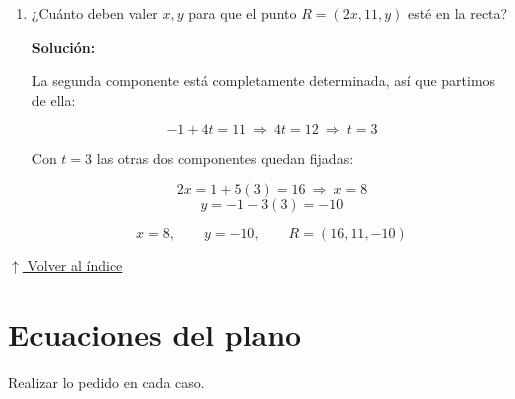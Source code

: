 \documentclass[12pt]{article}
\newcommand{\solucion}{%
    \vspace{0.8em}%
    \textbf{Solución:}%
    \vspace{0.8em}%
}
\newcommand{\volverindice}{%
    \vspace{1em}%
    \begin{flushright}%
        \hyperlink{indice}{\small $\uparrow$ Volver al índice}%
    \end{flushright}%
}
\begin{document}
\begin{enumerate}[label=\alph*.-]
\begin{enumerate}[label=\roman*)]
        \item ¿Cuánto deben valer $x,y$ para que el punto $R=(2x,11,y)$ esté
        en la recta?

        \solucion

        La segunda componente está completamente determinada, así que
        partimos de ella:

        \[
        -1+4t=11\ \Longrightarrow\ 4t=12\ \Longrightarrow\ t=3
        \]

        Con $t=3$ las otras dos componentes quedan fijadas:

        \[
        2x=1+5(3)=16\ \Longrightarrow\ x=8
        \]
        \[
        y=-1-3(3)=-10
        \]

        \[
        \boxed{x=8,\qquad y=-10,\qquad R=(16,11,-10)}
        \]

    \end{enumerate}

\end{enumerate}

\volverindice
\newpage


\section{Ecuaciones del plano}

Realizar lo pedido en cada caso.
\end{document}

